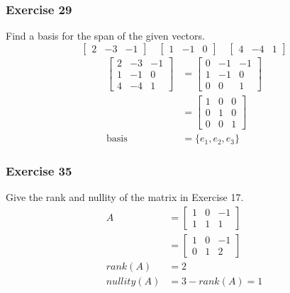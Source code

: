 \documentclass[letterpaper, 12pt]{math}
\begin{document}
\subsubsection*{Exercise 29}
Find a basis for the span of the given vectors.
\[ \begin{bmatrix}2 & -3 & -1\end{bmatrix}\quad
  \begin{bmatrix}1 & -1 & 0\end{bmatrix}\quad
  \begin{bmatrix}4 & -4 & 1\end{bmatrix} \]
\begin{align*}
  \begin{bmatrix}
    2 & -3 & -1 \\
    1 & -1 & 0 \\
    4 & -4 & 1
  \end{bmatrix} &= \begin{bmatrix}
    0 & -1 & -1 \\
    1 & -1 & 0 \\
    0 & 0 & 1
  \end{bmatrix} \\
  &= \begin{bmatrix}
    1 & 0 & 0 \\
    0 & 1 & 0 \\
    0 & 0 & 1
  \end{bmatrix} \\
  \text{basis} &= \{e_1,e_2,e_3\}
\end{align*}

\subsubsection*{Exercise 35}
Give the rank and nullity of the matrix in Exercise 17.
\begin{align*}
  A &= \begin{bmatrix}1 & 0 & -1 \\ 1 & 1 & 1\end{bmatrix} \\
  &= \begin{bmatrix}1 & 0 & -1 \\ 0 & 1 & 2\end{bmatrix} \\
  rank(A) &= 2 \\
  nullity(A) &= 3-rank(A) = 1
\end{align*}
\end{document}
